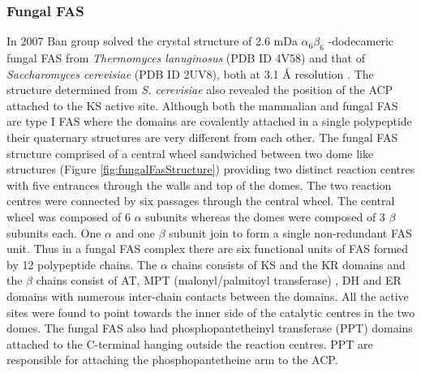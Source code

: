 		\subsubsection{Fungal FAS}
		\label{sec:fFAS}
		In 2007 Ban group solved the crystal structure of 2.6 mDa $ \alpha_{6}\beta_{6} $ -dodecameric fungal FAS from \textit{Thermomyces lanuginosus} (PDB ID 4V58)  and that of \textit{Saccharomyces cerevisiae} (PDB ID 2UV8), both at 3.1 \AA{} resolution \parencite{Jenni2007}. The structure determined from \textit{S. cerevisiae} also revealed the position of the ACP attached to the KS active site. Although both the mammalian and fungal FAS are type I FAS where the domains are covalently attached in a single polypeptide their quaternary structures are very different from each other. The fungal FAS structure comprised of a central wheel sandwiched between two dome like structures (Figure \ref{fig:fungalFasStructure}) providing two distinct reaction centres with five entrances through the walls and top of the domes. The two reaction centres were connected by six passages through the central wheel. The central wheel was composed of 6 $ \alpha $ subunits  whereas the domes were composed of 3 $ \beta $ subunits each. One $ \alpha $ and one $ \beta $ subunit join to form a single non-redundant FAS unit. Thus in a fungal FAS complex there are six functional units of FAS formed by 12 polypeptide chains. The $ \alpha $ chains consists of KS and the KR domains and the $\beta$ chains consist of AT, MPT (malonyl/palmitoyl transferase) , DH and ER domains with numerous inter-chain contacts between the domains. All the active sites were found to point towards the inner side of the catalytic centres in the two domes. The fungal FAS also had phosphopantetheinyl transferase (PPT) domains attached to the C-terminal hanging outside the reaction centres. PPT are responsible for attaching the phosphopantetheine arm to the ACP. 
		
